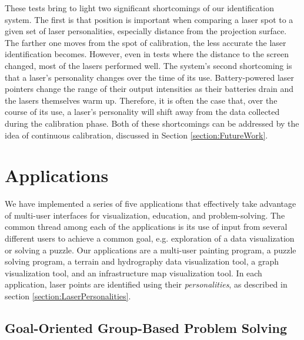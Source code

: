 \documentclass[review]{vgtc}                 %
\begin{document}
These tests bring to light two significant shortcomings of our
identification system. The first is that position is important when
comparing a laser spot to a given set of laser personalities,
especially distance from the projection surface. The farther one moves
from the spot of calibration, the less accurate the laser
identification becomes. However, even in tests where the distance to
the screen changed, most of the lasers performed well. The system's
second shortcoming is that a laser's personality changes over the time
of its use. Battery-powered laser pointers change the range of their
output intensities as their batteries drain and the lasers themselves
warm up. Therefore, it is often the case that, over the course of its
use, a laser's personality will shift away from the data collected
during the calibration phase. Both of these shortcomings can be
addressed by the idea of continuous calibration, discussed in Section
\ref{section:FutureWork}.
%

\section{Applications}
\label{section:Applications}

We have implemented a series of five applications that effectively
take advantage of multi-user interfaces for visualization, education,
and problem-solving. The common thread among each of the applications
is its use of input from several different users to achieve a common
goal, e.g. exploration of a data visualization or solving a
puzzle. Our applications are a multi-user painting program, a puzzle
solving program, a terrain and hydrography data visualization tool, a
graph visualization tool, and an infrastructure map visualization
tool. In each application, laser points are identified using their
\textit{personalities}, as described in section
\ref{section:LaserPersonalities}.

\subsection{Goal-Oriented Group-Based Problem Solving}
\end{document}
